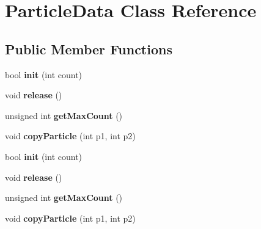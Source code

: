 \hypertarget{classParticleData}{}\section{Particle\+Data Class Reference}
\label{classParticleData}
\subsection*{Public Member Functions}
\begin{DoxyCompactItemize}
\item 
\mbox{\label{classParticleData_aa7fae6ac8c5ab67adb2b5e31a040ae4c}} 
bool {\bfseries init} (int count)
\item 
\mbox{\label{classParticleData_ac47baa2062cf4bb5a91f5dee6b86f026}} 
void {\bfseries release} ()
\item 
\mbox{\label{classParticleData_add9c58b12aa5e58bf7ce84a9bd75b72a}} 
unsigned int {\bfseries get\+Max\+Count} ()
\item 
\mbox{\label{classParticleData_a590345ed6ba33f5de521eed339391248}} 
void {\bfseries copy\+Particle} (int p1, int p2)
\item 
\mbox{\label{classParticleData_aa7fae6ac8c5ab67adb2b5e31a040ae4c}} 
bool {\bfseries init} (int count)
\item 
\mbox{\label{classParticleData_ac47baa2062cf4bb5a91f5dee6b86f026}} 
void {\bfseries release} ()
\item 
\mbox{\label{classParticleData_add9c58b12aa5e58bf7ce84a9bd75b72a}} 
unsigned int {\bfseries get\+Max\+Count} ()
\item 
\mbox{\label{classParticleData_a590345ed6ba33f5de521eed339391248}} 
void {\bfseries copy\+Particle} (int p1, int p2)
\end{DoxyCompactItemize}
